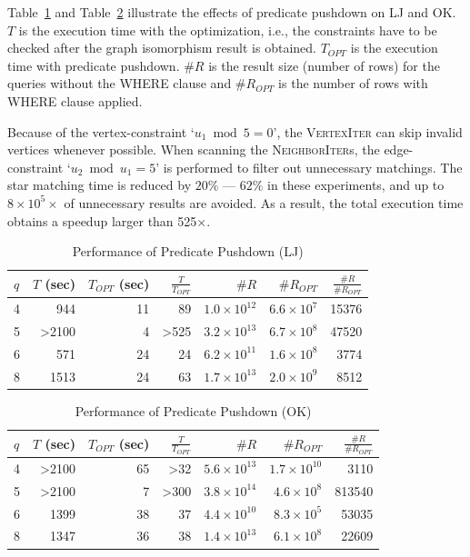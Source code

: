 Table~\ref{tab:pushdown_lj} and Table~\ref{tab:pushdown_ok} illustrate the effects of predicate pushdown on LJ and OK\@.
$T$ is the execution time with the optimization, i.e., the constraints have to be checked after the graph isomorphism result is obtained.
$T_{OPT}$ is the execution time with predicate pushdown.
$\#R$ is the result size (number of rows) for the queries without the WHERE clause and $\#R_{OPT}$ is the number of rows with WHERE clause applied.

Because of the vertex-constraint `$u_1 \bmod 5 = 0$',
the \textsc{VertexIter} can skip invalid vertices whenever possible.
When scanning the \textsc{NeighborIter}s,
the edge-constraint `$u_2 \bmod u_1 = 5$' is performed to filter out unnecessary matchings.
The star matching time is reduced by $20\%$ --- $62\%$ in these experiments,
and up to $8 \times 10^5 \times$ of unnecessary results are avoided.
As a result, the total execution time obtains a speedup larger than 525$\times$.
\begin{table}
  \caption{Performance of Predicate Pushdown (LJ)}\label{tab:pushdown_lj}
  \begin{tabular}{lrrrrrr}
    \toprule
    $q$ & \parbox{5mm}{$T$ (sec)} & \parbox{5mm}{$T_{OPT}$ (sec)} & $\frac{T}{T_{OPT}}$ & $\#R$ & $\#R_{OPT}$ & $\frac{\#R}{\#R_{OPT}}$ \\
     &   944 &        11 &       89 &   $1.0 \times 10^{12}$ &   $6.6 \times 10^7$ &     15376 \\
    5 & >2100 &         4 &     >525 &  $3.2 \times 10^{13}$  &   $6.7 \times 10^8$ &     47520 \\
    6 &   571 &        24 &       24 &   $6.2 \times 10^{11}$ &   $1.6 \times 10^8$ &      3774 \\
    8 &  1513 &        24 &       63 &   $1.7 \times 10^{13}$ &    $2.0 \times 10^9$ &      8512 \\
    \bottomrule
  \end{tabular}
\end{table}

\begin{table}
  \caption{Performance of Predicate Pushdown (OK)}\label{tab:pushdown_ok}
  \begin{tabular}{lrrrrrr}
    \toprule
    $q$ & \parbox{5mm}{$T$ (sec)} & \parbox{5mm}{$T_{OPT}$ (sec)} & $\frac{T}{T_{OPT}}$ & $\#R$ & $\#R_{OPT}$ & $\frac{\#R}{\#R_{OPT}}$ \\
     & >2100 &        65 &      >32 &  $5.6 \times 10^{13}$ &   $1.7 \times 10^{10}$ &      3110 \\
    5 & >2100 &         7 &     >300 &  $3.8 \times 10^{14}$ &     $4.6 \times 10^8$ &     813540 \\
    6 &  1399 &        38 &       37 &  $4.4 \times 10^{10}$ &     $8.3 \times 10^5$ &      53035 \\
    8 &  1347 &        36 &       38 &  $1.4 \times 10^{13}$ &     $6.1 \times 10^8$ &      22609 \\
    \bottomrule
  \end{tabular}
\end{table}
